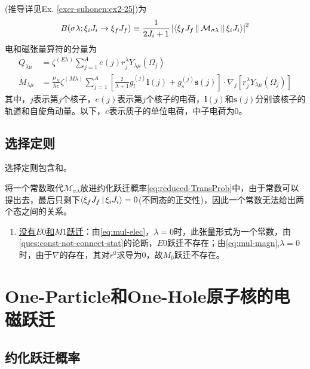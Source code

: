 (推导详见Ex. \ref{exer-suhonen:ex2-25})为
\begin{equation}
    B(\sigma\lambda; \xi_i J_i \rightarrow \xi_f J_f) \equiv \frac{1}{2J_i + 1} \left|\Braket{\xi_f J_f || \mathcal{M}_{\sigma\lambda} || \xi_i J_i}\right|^2
    \label{eq:reduced-TransProb}
\end{equation}
电和磁张量算符的分量为
\begin{align}
    Q_{\lambda\mu} &= \zeta^{(E\lambda)} \sum_{j = 1}^{A} e(j) r_j^{\lambda} Y_{\lambda\mu}(\Omega_{j}) \label{eq:mul-elec} \\
    M_{\lambda\mu} &= \frac{\mu_{N}}{\hbar c} \zeta^{(M\lambda)} \sum_{j = 1}^{A} \left[\frac{2}{\lambda+1}g_{l}^{(j)} \bm{l}(j) + g_{s}^{(j)}\bm{s}(j)\right] \cdot \nabla_j [r_j^\lambda Y_{\lambda\mu}(\Omega_j)]    \label{eq:mul-magn}
\end{align}
其中，$j$表示第$j$个核子，$e(j)$表示第$j$个核子的电荷，$\bm{l}(j)$和$\bm{s}(j)$分别该核子的轨道和自旋角动量。以下，$e$表示质子的单位电荷，中子电荷为0。

\subsection{选择定则}
选择定则包含和。
\begin{question}[一个常数无法连接两个不同的原子核态。]\label{ques:const-not-connect-stat}
    将一个常数取代$\mathcal{M}_{\sigma\lambda}$放进约化跃迁概率\cref{eq:reduced-TransProb}中，由于常数可以提出去，最后只剩下$\Braket{\xi_f J_f |\xi_i J_i} = 0$(不同态的正交性)，因此一个常数无法给出两个态之间的关系。
\end{question}
\begin{enumerate}
    \item \uline{没有\mbox{$E0$}和\mbox{$M1$}跃迁}：由\cref{eq:mul-elec}，$\lambda=0$时，此张量形式为一个常数，由\cref{ques:const-not-connect-stat}的论断，$E0$跃迁不存在；由\cref{eq:mul-magn},$\lambda=0$时，由于$\nabla$的存在，其对$r^0$求导为0，故$M_0$跃迁不存在。
\end{enumerate}

\section{One-Particle和One-Hole原子核的电磁跃迁}

\subsection{约化跃迁概率}
